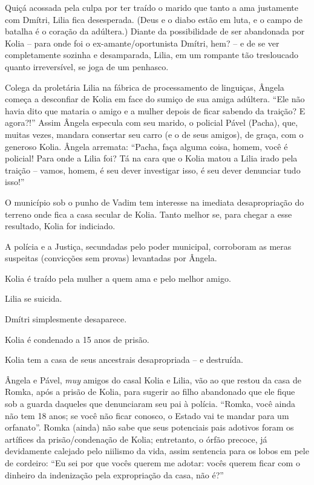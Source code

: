 Quiçá acossada pela culpa por ter traído o marido que tanto a ama
justamente com Dmítri, Lilia fica desesperada. (Deus e o diabo estão em
luta, e o campo de batalha é o coração da adúltera.) Diante da
possibilidade de ser abandonada por Kolia -- para onde foi o
ex-amante/oportunista Dmítri, hem? -- e de se ver completamente sozinha
e desamparada, Lilia, em um rompante tão tresloucado quanto
irreversível, se joga de um penhasco.

Colega da proletária Lilia na fábrica de processamento de linguiças,
Ângela começa a desconfiar de Kolia em face do sumiço de sua amiga
adúltera. ``Ele não havia dito que mataria o amigo e a mulher depois de
ficar sabendo da traição? E agora?!'' Assim Ângela especula com seu
marido, o policial Pável (Pacha), que, muitas vezes, mandara consertar
seu carro (e o de seus amigos), de graça, com o generoso Kolia. Ângela
arremata: ``Pacha, faça alguma coisa, homem, você é policial! Para onde
a Lilia foi? Tá na cara que o Kolia matou a Lilia irado pela traição --
vamos, homem, é seu dever investigar isso, é seu dever denunciar tudo
isso!''

O município sob o punho de Vadim tem interesse na imediata
desapropriação do terreno onde fica a casa secular de Kolia. Tanto
melhor se, para chegar a esse resultado, Kolia for indiciado.

A polícia e a Justiça, secundadas pelo poder municipal, corroboram as
meras suspeitas (convicções sem provas) levantadas por Ângela.

Kolia é traído pela mulher a quem ama e pelo melhor amigo.

Lilia se suicida.

Dmítri simplesmente desaparece.

Kolia é condenado a 15 anos de prisão.

Kolia tem a casa de seus ancestrais desapropriada -- e destruída.

Ângela e Pável, \emph{muy} amigos do casal Kolia e Lilia, vão ao que
restou da casa de Romka, após a prisão de Kolia, para sugerir ao filho
abandonado que ele fique sob a guarda daqueles que denunciaram seu pai à
polícia. ``Romka, você ainda não tem 18 anos; se você não ficar conosco,
o Estado vai te mandar para um orfanato''. Romka (ainda) não sabe que
seus potenciais pais adotivos foram os artífices da prisão/condenação de
Kolia; entretanto, o órfão precoce, já devidamente calejado pelo
niilismo da vida, assim sentencia para os lobos em pele de cordeiro:
``Eu sei por que vocês querem me adotar: vocês querem ficar com o
dinheiro da indenização pela expropriação da casa, não é?''


